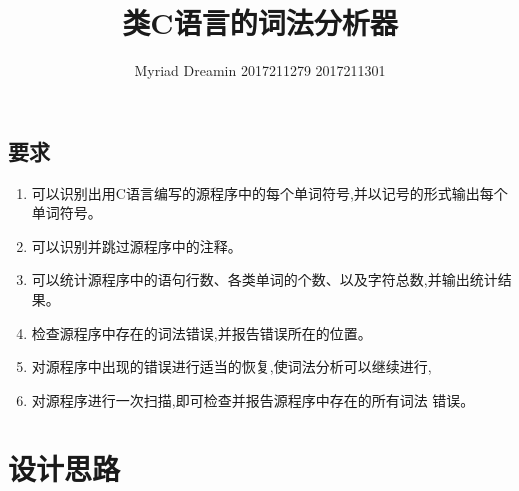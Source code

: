 \documentclass[UTF8]{ctexart}
\title{类C语言的词法分析器}
\author{Myriad Dreamin 2017211279 2017211301}
\date{}
\begin{document}
\setlength{\parindent}{2em}
\setlength{\baselineskip}{2.5em}
\maketitle
\subsection{要求}
\begin{enumerate}
	\item 可以识别出用C语言编写的源程序中的每个单词符号,并以记号的形式输出每个单词符号。
	\item 可以识别并跳过源程序中的注释。
	\item 可以统计源程序中的语句行数、各类单词的个数、以及字符总数,并输出统计结果。
	\item 检查源程序中存在的词法错误,并报告错误所在的位置。
	\item 对源程序中出现的错误进行适当的恢复,使词法分析可以继续进行,
	\item 对源程序进行一次扫描,即可检查并报告源程序中存在的所有词法
错误。
\end{enumerate}
\section{设计思路}
\end{document}
